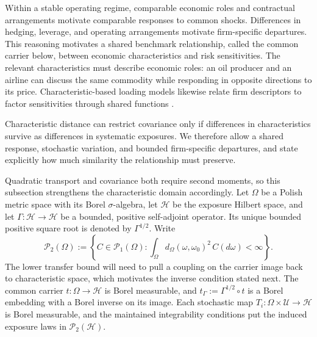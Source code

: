 Within a stable operating regime, comparable economic roles and contractual
arrangements motivate comparable responses to common shocks.
Differences in hedging, leverage, and operating arrangements motivate
firm-specific departures.
This reasoning motivates a shared benchmark relationship, called the common
carrier below, between economic characteristics and risk sensitivities.
The relevant characteristics must describe economic roles: an oil producer
and an airline can discuss the same commodity while responding in opposite
directions to its price.
Characteristic-based loading models likewise relate firm descriptors to
factor sensitivities through shared functions \citep{kelly_characteristics_2019}.

Characteristic distance can restrict covariance only if differences in
characteristics survive as differences in systematic exposures.
We therefore allow a shared response, stochastic variation, and bounded
firm-specific departures, and state explicitly how much similarity the
relationship must preserve.

Quadratic transport and covariance both require second moments, so this
subsection strengthens the characteristic domain accordingly.
Let $\Omega$ be a Polish metric space with its Borel $\sigma$-algebra, let
$\mathcal H$ be the exposure Hilbert space, and let $\Gamma:\mathcal
H\to\mathcal H$ be a bounded, positive self-adjoint operator.
Its unique bounded positive square root is denoted by $\Gamma^{1/2}$.
Write
\begin{equation}\label{eq:random-p2-domain}
  \mathcal P_2(\Omega)
  :=\left\{C\in\mathcal P_1(\Omega):
  \int_\Omega d_\Omega(\omega,\omega_0)^2\,C(d\omega)<\infty\right\}.
\end{equation}
The lower transfer bound will need to pull a coupling on the carrier image
back to characteristic space, which motivates the inverse condition stated next.
The common carrier $t:\Omega\to\mathcal H$ is Borel measurable, and
$t_\Gamma:=\Gamma^{1/2}\circ t$ is a Borel embedding with a Borel inverse on its image.
Each stochastic map $T_i:\Omega\times\mathcal U\to\mathcal H$ is Borel
measurable, and the maintained integrability conditions put the induced
exposure laws in $\mathcal P_2(\mathcal H)$.

